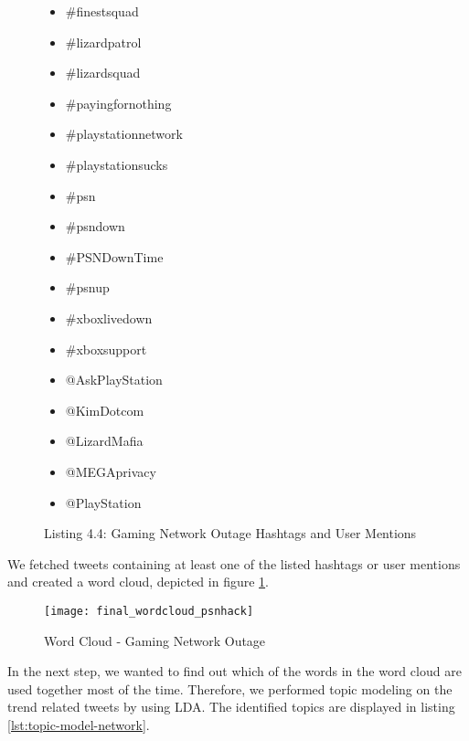 \begin{figure}[H]
\begin{multicols}{3}
\begin{itemize}[label={}]
	\item \#finestsquad
	\item \#lizardpatrol
    \item \#lizardsquad
    \item \#payingfornothing
    \item \#playstationnetwork
    \item \#playstationsucks
    \item \#psn
    \item \#psndown
    \item \#PSNDownTime
    \item \#psnup
    \item \#xboxlivedown
    \item \#xboxsupport
    \item @AskPlayStation
    \item @KimDotcom
    \item @LizardMafia
    \item @MEGAprivacy
    \item @PlayStation
\end{itemize}
  \fixspacing
\end{multicols}
\caption*{Listing 4.4: Gaming Network Outage Hashtags and User Mentions}
\end{figure}

We fetched tweets containing at least one of the listed hashtags or user mentions and created a word cloud, depicted in figure \ref{fig:christmas-network-outage-word-cloud}.

\begin{figure}[H]
  \centering
        \texttt{[image: final\_wordcloud\_psnhack]}
  \caption[Word Cloud - Gaming Network Outage]{Word Cloud - Gaming Network Outage}
  \label{fig:christmas-network-outage-word-cloud}
  \vspace{-1.3em}
\end{figure}

In the next step, we wanted to find out which of the words in the word cloud are used together most of the time. Therefore, we performed topic modeling on the trend related tweets by using LDA.
The identified topics are displayed in listing \ref{lst:topic-model-network}.

